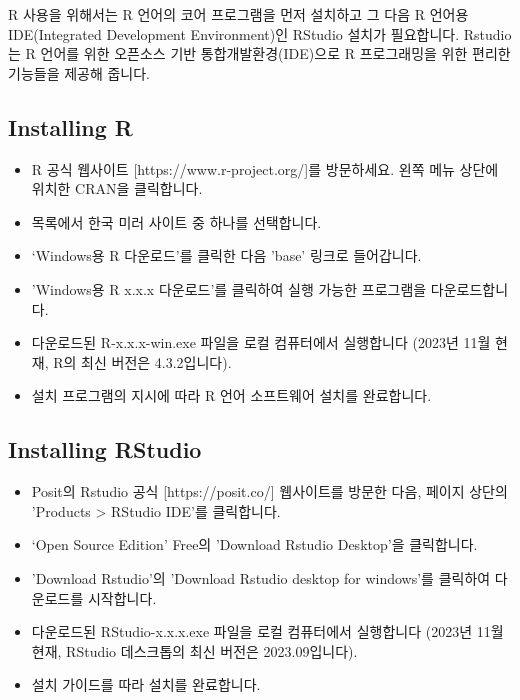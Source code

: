 \documentclass[
  a4paper,
]{book}
\providecommand{\tightlist}{%
  \setlength{\itemsep}{0pt}\setlength{\parskip}{0pt}}\usepackage{longtable,booktabs,array}
\begin{document}
R 사용을 위해서는 R 언어의 코어 프로그램을 먼저 설치하고 그 다음 R
언어용 IDE(Integrated Development Environment)인 RStudio 설치가
필요합니다. Rstudio는 R 언어를 위한 오픈소스 기반 통합개발환경(IDE)으로
R 프로그래밍을 위한 편리한 기능들을 제공해 줍니다.

\hypertarget{installing-r}{%
\subsection{Installing R}\label{installing-r}}

\begin{itemize}
\tightlist
\item
  R 공식 웹사이트 {[}https://www.r-project.org/{]}를 방문하세요. 왼쪽
  메뉴 상단에 위치한 CRAN을 클릭합니다.
\item
  목록에서 한국 미러 사이트 중 하나를 선택합니다.
\item
  `Windows용 R 다운로드'를 클릭한 다음 'base' 링크로 들어갑니다.
\item
  'Windows용 R x.x.x 다운로드'를 클릭하여 실행 가능한 프로그램을
  다운로드합니다.
\item
  다운로드된 R-x.x.x-win.exe 파일을 로컬 컴퓨터에서 실행합니다 (2023년
  11월 현재, R의 최신 버전은 4.3.2입니다).
\item
  설치 프로그램의 지시에 따라 R 언어 소프트웨어 설치를 완료합니다.
\end{itemize}

\hypertarget{installing-rstudio}{%
\subsection{Installing RStudio}\label{installing-rstudio}}

\begin{itemize}
\tightlist
\item
  Posit의 Rstudio 공식 {[}https://posit.co/{]} 웹사이트를 방문한 다음,
  페이지 상단의 'Products \textgreater{} RStudio IDE'를 클릭합니다.
\item
  `Open Source Edition' Free의 'Download Rstudio Desktop'을 클릭합니다.
\item
  'Download Rstudio'의 'Download Rstudio desktop for windows'를 클릭하여
  다운로드를 시작합니다.
\item
  다운로드된 RStudio-x.x.x.exe 파일을 로컬 컴퓨터에서 실행합니다 (2023년
  11월 현재, RStudio 데스크톱의 최신 버전은 2023.09입니다).
\item
  설치 가이드를 따라 설치를 완료합니다.
\end{itemize}
\end{document}

